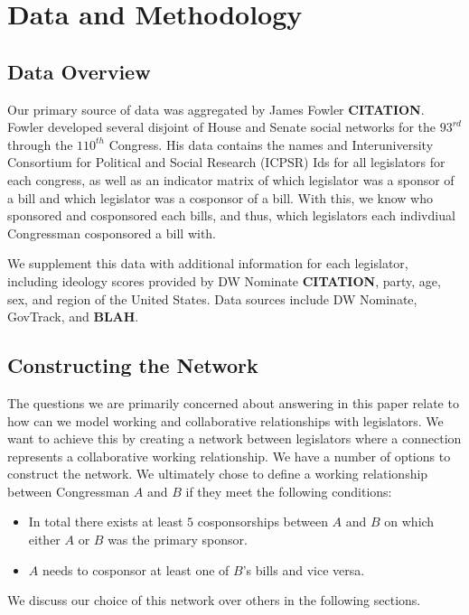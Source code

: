 \section{Data and Methodology}

\subsection{Data Overview}

Our primary source of data was aggregated by James Fowler \textbf{CITATION}.
Fowler developed several disjoint of House and Senate social networks for the
$93^{rd}$ through the $110^{th}$ Congress. His data contains the names and
Interuniversity Consortium for Political and Social Research (ICPSR) Ids for all
legislators for each congress, as well as an indicator matrix of which
legislator was a sponsor of a bill and which legislator was a cosponsor of a
bill. With this, we know who sponsored and cosponsored each bills, and thus, 
which legislators each indivdiual Congressman cosponsored a bill with.

We supplement this data with additional information for each legislator, 
including ideology scores provided by DW Nominate \textbf{CITATION}, party, 
age, sex, and region of the United States. Data sources include DW Nominate, 
GovTrack, and \textbf{BLAH}.

\subsection{Constructing the Network}

The questions we are primarily concerned about answering in this paper relate 
to how can we model working and collaborative relationships with legislators. 
We want to achieve this by creating a network between legislators where a 
connection represents a collaborative working relationship. We have a number of 
options to construct the network. We ultimately chose to define a working 
relationship between Congressman $A$ and $B$ if they meet the following 
conditions:

\begin{itemize}
	\item In total there exists at least $5$ cosponsorships between $A$ and $B$ 
	on which either $A$ or $B$ was the primary sponsor.
	\item $A$ needs to cosponsor at least one of $B$'s bills and vice versa.
\end{itemize}

We discuss our choice of this network over others in the following sections.


